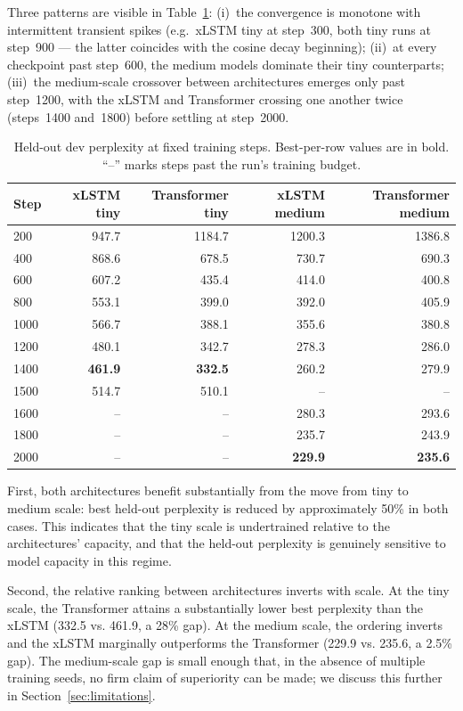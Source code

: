 \documentclass[11pt]{article}
\begin{document}
Three patterns are visible in Table~\ref{tab:ppltrajectory}: (i)~the
convergence is monotone with intermittent transient spikes (e.g.\ xLSTM
tiny at step~300, both tiny runs at step~900 --- the latter coincides
with the cosine decay beginning); (ii)~at every checkpoint past
step~600, the medium models dominate their tiny counterparts; (iii)~the
medium-scale crossover between architectures emerges only past
step~1200, with the xLSTM and Transformer crossing one another twice
(steps~1400 and~1800) before settling at step~2000.

\begin{table}[h]
\centering
\caption{Held-out dev perplexity at fixed training steps. Best-per-row
  values are in bold. ``--'' marks steps past the run's training budget.}
\label{tab:ppltrajectory}
\small
\setlength{\tabcolsep}{4pt}
\begin{tabular}{lrrrr}
\toprule
Step & xLSTM tiny & Transformer tiny & xLSTM medium & Transformer medium \\
\midrule
200   & 947.7 & 1184.7 & 1200.3 & 1386.8 \\
400   & 868.6 & 678.5  & 730.7  & 690.3  \\
600   & 607.2 & 435.4  & 414.0  & 400.8  \\
800   & 553.1 & 399.0  & 392.0  & 405.9  \\
1000  & 566.7 & 388.1  & 355.6  & 380.8  \\
1200  & 480.1 & 342.7  & 278.3  & 286.0  \\
1400  & \textbf{461.9} & \textbf{332.5}  & 260.2  & 279.9 \\
1500  & 514.7 & 510.1  & --     & --     \\
1600  & --    & --     & 280.3  & 293.6  \\
1800  & --    & --     & 235.7  & 243.9  \\
2000  & --    & --     & \textbf{229.9}  & \textbf{235.6} \\
\bottomrule
\end{tabular}
\end{table}

First, both architectures benefit substantially from the move from
tiny to medium scale: best held-out perplexity is reduced by approximately
50\% in both cases. This indicates that the tiny scale is undertrained
relative to the architectures' capacity, and that the held-out perplexity
is genuinely sensitive to model capacity in this regime.

Second, the relative ranking between architectures inverts with scale.
At the tiny scale, the Transformer attains a substantially lower best
perplexity than the xLSTM (332.5 vs. 461.9, a 28\% gap). At the medium
scale, the ordering inverts and the xLSTM marginally outperforms the
Transformer (229.9 vs. 235.6, a 2.5\% gap). The medium-scale gap is
small enough that, in the absence of multiple training seeds, no firm
claim of superiority can be made; we discuss this further in
Section~\ref{sec:limitations}.
\end{document}

